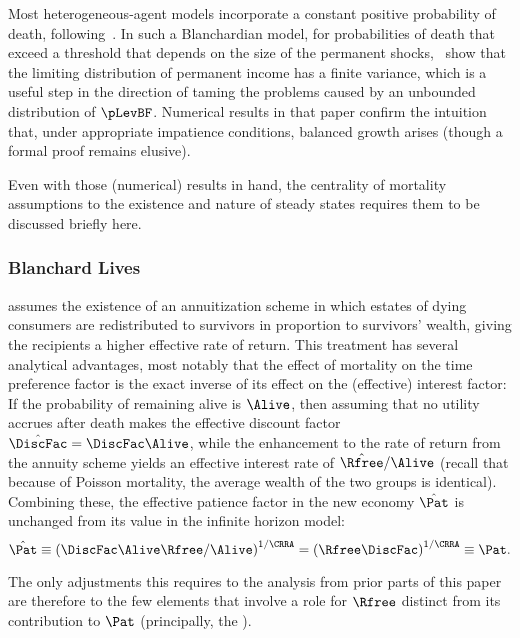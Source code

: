 \documentclass[BufferStockTheory]{subfiles}
\begin{document}
Most heterogeneous-agent models incorporate a constant positive probability of death, following~\cite{blanchardFinite}.  In such a Blanchardian model, for probabilities of death that exceed a threshold that depends on the size of the permanent shocks,~\cite{cstwMPC} show that the limiting distribution of permanent income has a finite variance, which is a useful step in the direction of taming the problems caused by an unbounded distribution of $\pLevBF$.  Numerical results in that paper confirm the intuition that, under appropriate impatience conditions, balanced growth arises (though a formal proof remains elusive).

Even with those (numerical) results in hand, the centrality of mortality assumptions to the existence and nature of steady states requires them to be discussed briefly here.

\hypertarget{Blanchard-Lives}{}
\subsubsection{Blanchard Lives}
\cite{blanchardFinite} assumes the existence of an annuitization scheme in which estates of dying consumers are redistributed to survivors in proportion to survivors' wealth, giving the recipients a higher effective rate of return. This treatment has several analytical advantages, most notably that the effect of mortality on the time preference factor is the exact inverse of its effect on the (effective) interest factor:  If the probability of remaining alive is $\Alive$, then assuming that no utility accrues after death makes the effective discount factor $\hat{\DiscFac}=\DiscFac\Alive$, while the enhancement to the rate of return from the annuity scheme yields an effective interest rate of $\hat{\Rfree}/\Alive$ (recall that because of Poisson mortality, the average wealth of the two groups is identical).  Combining these, the effective patience factor in the new economy $\hat{\Pat}$ is unchanged from its value in the infinite horizon model:%
\begin{equation}
  \hat{\Pat} \equiv {\left(\DiscFac \Alive \Rfree / \Alive\right)}^{1/\CRRA} = {\left(\Rfree \DiscFac\right)}^{1/\CRRA} \equiv \Pat.
\end{equation}

The only adjustments this requires to the analysis from prior parts of this paper are therefore to the few elements that involve a role for $\Rfree$ distinct from its contribution to $\Pat$ (principally, the {\RIC}).  %
\end{document}
